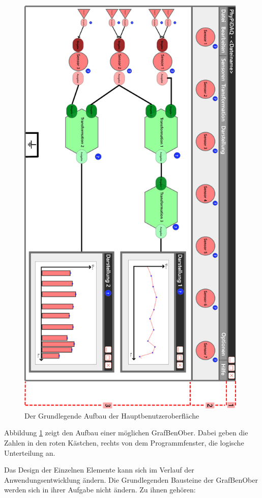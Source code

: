 \documentclass[parskip=full]{scrartcl}
\begin{document}
\begin{figure}[htbp]
	\begin{center}
		\includegraphics[width = 11cm]{Grafik/GUI-mit-Segmenten.png}
		\caption{Der Grundlegende Aufbau der Hauptbenutzeroberfläche}
		\label{GUI_Grundlage}
	\end{center}
\end{figure}

Abbildung \ref{GUI_Grundlage} zeigt den Aufbau einer möglichen \gls{GrafBenOber}. Dabei geben die Zahlen in den roten Kästchen, rechts von dem Programmfenster, die logische Unterteilung an.

Das Design der Einzelnen Elemente kann sich im Verlauf der Anwendungsentwicklung ändern. Die Grundlegenden Bausteine der \gls{GrafBenOber} werden sich in ihrer Aufgabe nicht ändern. Zu ihnen gehören:
\end{document}
